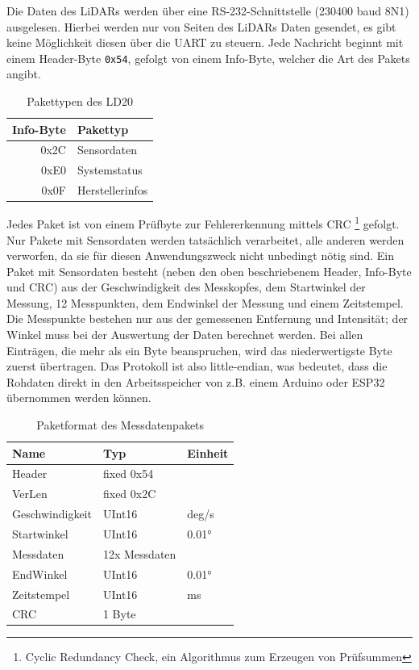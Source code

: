 Die Daten des LiDARs werden über eine RS-232-Schnittstelle (230400 baud 8N1) ausgelesen.
%
Hierbei werden nur von Seiten des LiDARs Daten gesendet,
es gibt keine Möglichkeit diesen über die UART zu steuern.
%
Jede Nachricht beginnt mit einem Header-Byte \texttt{0x54},
gefolgt von einem Info-Byte,
welcher die Art des Pakets angibt.
\begin{table}[H]
    \centering
    \begin{tabular}{r|l}
    Info-Byte & Pakettyp   \\ \hline
    0x2C      & Sensordaten \\
    0xE0      & Systemstatus \\
    0x0F      & Herstellerinfos   
    \end{tabular}
    \caption{Pakettypen des LD20}
    \label{tab:ld20-packet-overview}
\end{table}
Jedes Paket ist von einem Prüfbyte zur Fehlererkennung mittels CRC%
\footnote{Cyclic Redundancy Check, ein Algorithmus zum Erzeugen von Prüfsummen}
gefolgt.
%
Nur Pakete mit Sensordaten werden tatsächlich verarbeitet,
alle anderen werden verworfen,
da sie für diesen Anwendungszweck nicht unbedingt nötig sind.
%
Ein Paket mit Sensordaten besteht (neben den oben beschriebenem Header, Info-Byte und CRC)
aus der Geschwindigkeit des Messkopfes,
dem Startwinkel der Messung,
12 Messpunkten,
dem Endwinkel der Messung
und einem Zeitstempel.
%
Die Messpunkte bestehen nur aus der gemessenen Entfernung und Intensität;
der Winkel muss bei der Auswertung der Daten berechnet werden.
%
Bei allen Einträgen, die mehr als ein Byte beanspruchen,
wird das niederwertigste Byte zuerst übertragen.
%
Das Protokoll ist also little-endian,
was bedeutet, dass die Rohdaten direkt in den Arbeitsspeicher von z.B. einem Arduino oder ESP32 übernommen werden können.
\begin{table}[H]
    \centering
    \begin{tabular}{l|l|l}
    Name            & Typ           & Einheit  \\ \hline
    Header          & fixed 0x54    &   \\
    VerLen          & fixed 0x2C    &   \\
    Geschwindigkeit & UInt16        & deg/s \\
    Startwinkel     & UInt16        & 0.01°  \\
    Messdaten       & 12x Messdaten &    \\
    EndWinkel       & UInt16        & 0.01° \\
    Zeitstempel     & UInt16        & ms \\
    CRC             & 1 Byte        &
    \end{tabular}
    \caption{Paketformat des Messdatenpakets}
    \label{tab:ld20-measurement-packet}
\end{table}
